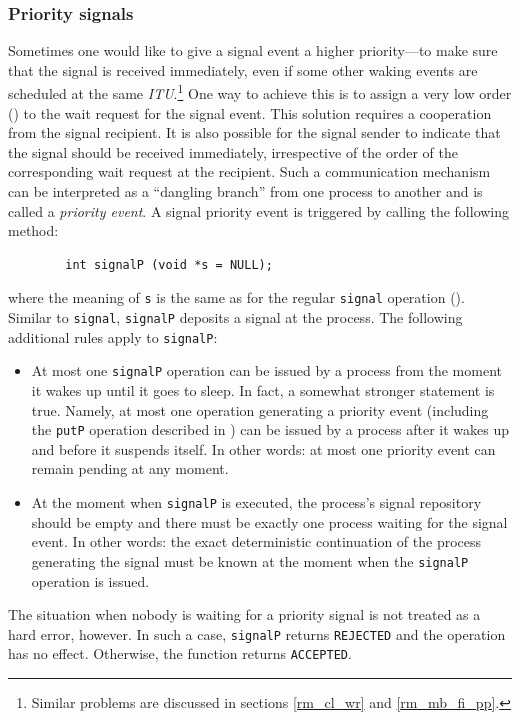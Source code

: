 \subsubsection{Priority signals}
\label{rm_pr_sp_ps}

Sometimes one would like to give a signal event
a higher priority---to make sure that the signal is received immediately,
even if some other waking events are scheduled at the same
{\em ITU}.\footnote{Similar problems are discussed in
sections \ref{rm_cl_wr} and \ref{rm_mb_fi_pp}.}
One way to achieve this is to assign a very low order ()
to the wait request for the signal event.
This solution requires a cooperation from the signal recipient.
It is also possible for the signal sender to indicate that the signal
should be received immediately, irrespective of the order of the
corresponding wait request at the recipient.
Such a communication mechanism can be interpreted as a
``dangling branch'' from one process to another and is called a 
{\em priority event}.
A signal priority event is triggered by calling the following method:
\begin{verbatim}
        int signalP (void *s = NULL);
\end{verbatim}
where the meaning of {\tt s} is the same as for the regular
{\tt signal} operation ().
Similar to {\tt signal}, {\tt signalP} deposits a signal at the process.
The following additional rules apply to {\tt signalP}:
\begin{itemize}
\item
At most one {\tt signalP} operation can be issued by a process from the moment
it wakes up until it goes to sleep.
In fact, a somewhat stronger statement is true.
Namely, at most one operation generating a priority event (including the
{\tt putP} operation described in ) can be issued by a process
after it wakes up and before it suspends itself.
In other words: at most one priority event can remain pending at any moment.
\item
At the moment when {\tt signalP} is executed, the process's signal
repository should be empty and
there must be exactly one process waiting for the signal event.
In other words: the exact deterministic continuation of the process
generating the signal must be known at the moment when the {\tt signalP}
operation is issued.
\end{itemize}

The situation when nobody is waiting for a priority signal is not treated
as a hard error, however.
In such a case, {\tt signalP} returns {\tt REJECTED} and the operation has
no effect.
Otherwise, the function returns {\tt ACCEPTED}.

